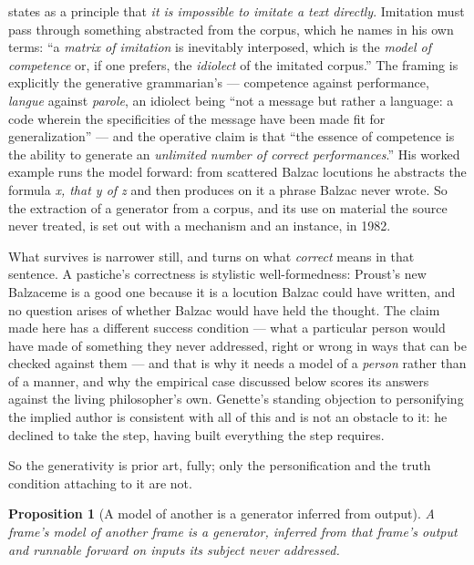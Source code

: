 \documentclass[11pt,a4paper]{article}
\newtheorem{proposition}[definition]{Proposition}
\theoremstyle{remark}\newtheorem{remark}[definition]{Remark}
\begin{document}
\citet[82--83]{genette1982} states as a principle that \emph{it is impossible to imitate a text
directly}. Imitation must pass through something abstracted from the corpus, which he names in his own
terms: ``a \emph{matrix of imitation} is inevitably interposed, which is the \emph{model of competence}
or, if one prefers, the \emph{idiolect} of the imitated corpus.'' The framing is explicitly the
generative grammarian's --- competence against performance, \emph{langue} against \emph{parole}, an
idiolect being ``not a message but rather a language: a code wherein the specificities of the message
have been made fit for generalization'' --- and the operative claim is that ``the essence of competence
is the ability to generate an \emph{unlimited number of correct performances}.'' His worked example
runs the model forward: from scattered Balzac locutions he abstracts the formula \emph{x, that y of z}
and then produces on it a phrase Balzac never wrote. So the extraction of a generator from a corpus,
and its use on material the source never treated, is set out with a mechanism and an instance, in 1982.

What survives is narrower still, and turns on what \emph{correct} means in that sentence. A pastiche's
correctness is stylistic well-formedness: Proust's new Balzaceme is a good one because it is a
locution Balzac could have written, and no question arises of whether Balzac would have held the
thought. The claim made here has a different success condition --- what a particular person would have
made of something they never addressed, right or wrong in ways that can be checked against them --- and
that is why it needs a model of a \emph{person} rather than of a manner, and why the empirical case
discussed below scores its answers against the living philosopher's own. Genette's standing objection
to personifying the implied author is consistent with all of this and is not an obstacle to it: he
declined to take the step, having built everything the step requires.

So the generativity is prior art, fully; only the personification and the truth condition attaching to
it are not.

\begin{proposition}[A model of another is a generator inferred from output]\label{prop:other-model}
A frame's model of another frame is a generator, inferred from that frame's output and runnable
forward on inputs its subject never addressed.
\end{proposition}
\end{document}
